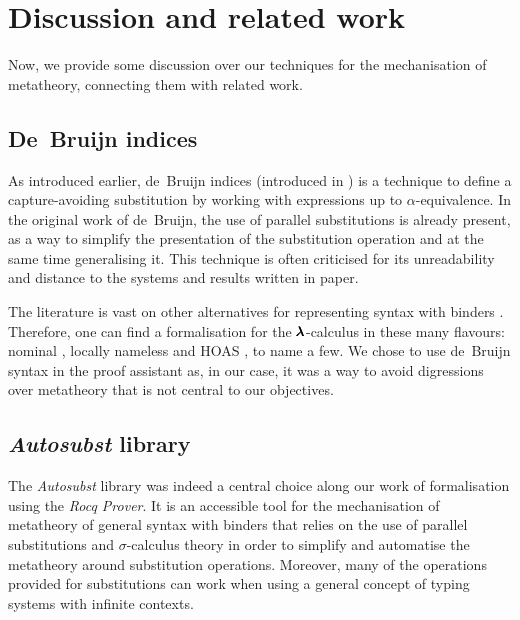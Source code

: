 
\section{Discussion and related work}

Now, we provide some discussion over our techniques for the mechanisation of metatheory, connecting them with related work.

\subsection{De~Bruijn indices}
As introduced earlier, de~Bruijn indices (introduced in \cite{deBruijn}) is a technique to define a capture-avoiding substitution by working with expressions up to $\alpha$-equivalence.
In the original work of de~Bruijn, the use of parallel substitutions is already present, as a way to simplify the presentation of the substitution operation and at the same time generalising it.
This technique is often criticised for its unreadability and distance to the systems and results written in paper.

The literature is vast on other alternatives for representing syntax with binders \cite[Section~2.3]{POPLmark}.
Therefore, one can find a formalisation for the $\pmb{\lambda}$-calculus in these many flavours: nominal \cite{Vestergaard2001}, locally nameless \cite{McKinna1999} and HOAS \cite{Despeyroux1995}, to name a few.
We chose to use de~Bruijn syntax in the proof assistant as, in our case, it was a way to avoid digressions over metatheory that is not central to our objectives.

\subsection{\textit{Autosubst} library}
The \textit{Autosubst} library \cite{AutosubstSchafer} was indeed a central choice along our work of formalisation using the \textit{Rocq Prover}.
It is an accessible tool for the mechanisation of metatheory of general syntax with binders that relies on the use of parallel substitutions and $\sigma$-calculus theory in order to simplify and automatise the metatheory around substitution operations.
Moreover, many of the operations provided for substitutions can work when using a general concept of typing systems with infinite contexts.

